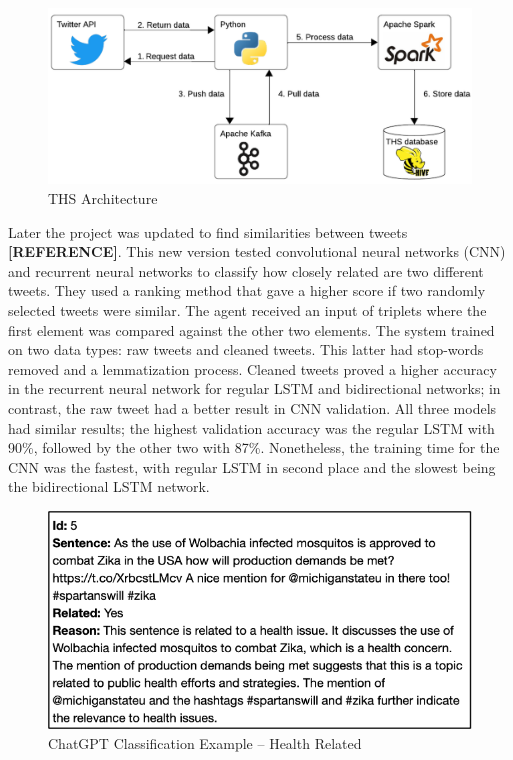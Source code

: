   \begin{figure}[!h]
    \centering
        \includegraphics[width=1\linewidth]{images/ths_architecture.png}
        \caption{THS Architecture}
        \label{ths_architecture}
\end{figure}

 
Later the project was updated to find similarities between tweets \textbf{[REFERENCE]}. This new version tested convolutional neural networks (CNN) and recurrent neural networks to classify how closely related are two different tweets.
They used a ranking method that gave a higher score if two randomly selected tweets were similar. The agent received an input of triplets where the first element was compared against the other two elements.
The system trained on two data types: raw tweets and cleaned tweets. This latter had stop-words removed and a lemmatization process. Cleaned tweets proved a higher accuracy in the recurrent neural network
for regular LSTM and bidirectional networks; in contrast, the raw tweet had a better result in CNN validation. All three models had similar results; the highest validation accuracy was the regular LSTM with 90\%,
followed by the other two with 87\%. Nonetheless, the training time for the CNN was the fastest, with regular LSTM in second place and the slowest being the bidirectional LSTM network. 


  \begin{figure}[!h]
    \centering
        \includegraphics[width=0.8\linewidth]{images/base_gpt_health.png}
        \caption{ChatGPT Classification Example – Health Related}
        \label{gpt_health}
\end{figure}


